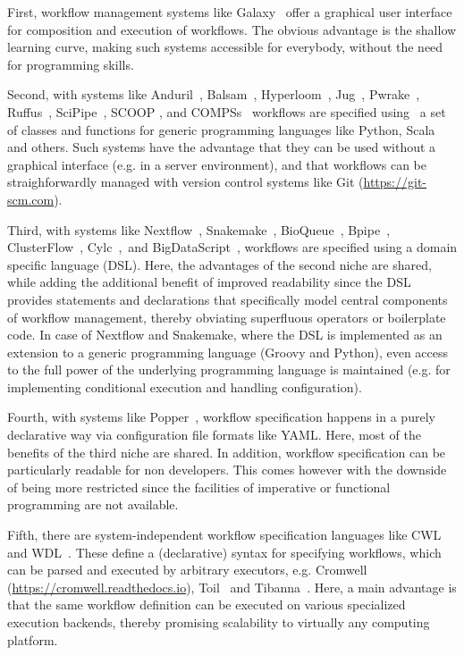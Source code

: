 \documentclass[parskip=half]{scrartcl}
\let\plainurl\url
\renewcommand{\url}[1]{\protect\plainurl{#1}}
\begin{document}
First, workflow management systems like Galaxy~\parencite{Afgan2018} offer a graphical user interface for composition and execution of workflows.
The obvious advantage is the shallow learning curve, making such systems accessible for everybody, without the need for programming skills.

Second, with systems like Anduril~\parencite{Cervera2019}, Balsam~\parencite{papka2018}, Hyperloom~\parencite{cima2018hyperloom}, Jug~\parencite{Coelho_2017}, Pwrake~\parencite{Tanaka_2010}, Ruffus~\parencite{Goodstadt2010}, SciPipe~\parencite{Lampa2019}, SCOOP \parencite{SCOOP_XSEDE2014}, and COMPSs~\parencite{Lordan_2013} workflows are specified using~ a set of classes and functions for generic programming languages like Python, Scala and others.
Such systems have the advantage that they can be used without a graphical interface (e.g. in a server environment), and that workflows can be straighforwardly managed with version control systems like Git (\url{https://git-scm.com}).~ 

Third, with systems like Nextflow~\parencite{Di_Tommaso_2017}, Snakemake~\parencite{Köster2012}, BioQueue~\parencite{Yao2017}, Bpipe~\parencite{Sadedin2012}, ClusterFlow~\parencite{Ewels2016}, Cylc~\parencite{J_Oliver_2018},~and BigDataScript~\parencite{Cingolani_2014}, workflows are specified using a domain specific language (DSL).
Here, the advantages of the second niche are shared, while adding the additional benefit of improved readability since the DSL provides statements and declarations that specifically model central components of workflow management, thereby obviating superfluous operators or boilerplate code.
In case of Nextflow and Snakemake, where the DSL is implemented as an extension to a generic programming language (Groovy and Python), even access to the full power of the underlying programming language is maintained (e.g. for implementing conditional execution and handling configuration).

Fourth, with systems like Popper~\parencite{Jimenez_2017}, workflow specification happens in a purely declarative way via configuration file formats like YAML.
Here, most of the benefits of the third niche are shared.
In addition, workflow specification can be particularly readable for non developers.
This comes however with the downside of being more restricted since the facilities of imperative or functional programming are not available.

Fifth, there are system-independent workflow specification languages like CWL~\parencite{cwl} and WDL~\parencite{voss_full-stack_2017}.
These define a (declarative) syntax for specifying workflows, which can be parsed and executed by arbitrary executors, e.g. Cromwell (\url{https://cromwell.readthedocs.io}), Toil~\parencite{Vivian_2017} and Tibanna~\parencite{Lee_2019}.
Here, a main advantage is that the same workflow definition can be executed on various specialized execution backends, thereby promising scalability to virtually any computing platform.
\end{document}
